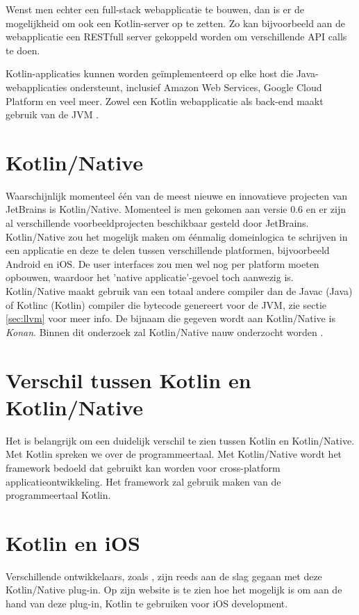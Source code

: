 Wenst men echter een full-stack webapplicatie te bouwen, dan is er de mogelijkheid om ook een Kotlin-server op te zetten. Zo kan bijvoorbeeld aan de webapplicatie een RESTfull server gekoppeld worden om verschillende API calls te doen.

Kotlin-applicaties kunnen worden geïmplementeerd op elke host die Java-webapplicaties ondersteunt, inclusief Amazon Web Services, Google Cloud Platform en veel meer. Zowel een Kotlin webapplicatie als back-end maakt gebruik van de JVM \autocite{JetBrainsServer}.

\section{Kotlin/Native}
\label{sec:kotlinnative}
Waarschijnlijk momenteel één van de meest nieuwe en innovatieve projecten van JetBrains is Kotlin/Native. Momenteel is men gekomen aan versie 0.6 en er zijn al verschillende voorbeeldprojecten beschikbaar gesteld door JetBrains. Kotlin/Native zou het mogelijk maken om éénmalig domeinlogica te schrijven in een applicatie en deze te delen tussen verschillende platformen, bijvoorbeeld Android en iOS. De user interfaces zou men wel nog per platform moeten opbouwen, waardoor het 'native applicatie'-gevoel toch aanwezig is. Kotlin/Native maakt gebruik van een totaal andere compiler dan de Javac (Java) of Kotlinc (Kotlin) compiler die bytecode genereert voor de JVM, zie sectie \ref{sec:llvm} voor meer info. De bijnaam die gegeven wordt aan Kotlin/Native is \textit{Konan}. Binnen dit onderzoek zal Kotlin/Native nauw onderzocht worden \autocite{AlbertGao}.

\section{Verschil tussen Kotlin en Kotlin/Native}
\label{sec:differenceKotlinAndNative}
Het is belangrijk om een duidelijk verschil te zien tussen Kotlin en Kotlin/Native. Met Kotlin spreken we over de programmeertaal. Met Kotlin/Native wordt het framework bedoeld dat gebruikt kan worden voor cross-platform applicatieontwikkeling. Het framework zal gebruik maken van de programmeertaal Kotlin.

\section{Kotlin en iOS}
Verschillende ontwikkelaars, zoals \textcite{GaoIOS}, zijn reeds aan de slag gegaan met deze Kotlin/Native plug-in. Op zijn website is te zien hoe het mogelijk is om aan de hand van deze plug-in, Kotlin te gebruiken voor iOS development. 

